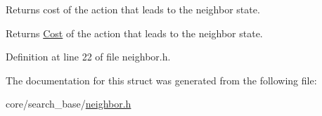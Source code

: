 Returns cost of the action that leads to the neighbor state. 

\begin{DoxyReturn}{Returns}
\hyperlink{structCost}{Cost} of the action that leads to the neighbor state. 
\end{DoxyReturn}


Definition at line 22 of file neighbor.\+h.



The documentation for this struct was generated from the following file\+:\begin{DoxyCompactItemize}
\item 
core/search\+\_\+base/\hyperlink{neighbor_8h}{neighbor.\+h}\end{DoxyCompactItemize}
